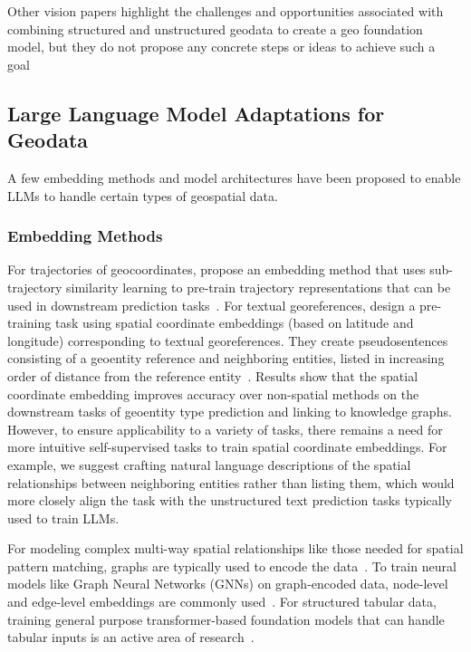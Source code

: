 Other vision papers highlight the challenges and opportunities associated with combining structured and unstructured geodata to create a geo foundation model, but they do not propose any concrete steps or ideas to achieve such a goal~\cite{Xie2023, Tan2023}



\subsection{Large Language Model Adaptations for Geodata}
A few embedding methods and model architectures have been proposed to enable LLMs to handle certain types of geospatial data.

\subsubsection{Embedding Methods}
For trajectories of geocoordinates, \citeauthor{Hu2023} propose an embedding method that uses sub-trajectory similarity learning to pre-train trajectory representations that can be used in downstream prediction tasks~\cite{Hu2023}.
%
For textual georeferences, \citeauthor{Li2021} design a pre-training task using spatial coordinate embeddings (based on latitude and longitude) corresponding to textual georeferences.
They create pseudosentences consisting of a geoentity reference and neighboring entities, listed in increasing order of distance from the reference entity~\cite{Li2021}.
Results show that the spatial coordinate embedding improves accuracy over non-spatial methods on the downstream tasks of geoentity type prediction and linking to knowledge graphs.
However, to ensure applicability to a variety of tasks, there remains a need for more intuitive self-supervised tasks to train spatial coordinate embeddings.
For example, we suggest crafting natural language descriptions of the spatial relationships between neighboring entities rather than listing them, which would more closely align the task with the unstructured text prediction tasks typically used to train LLMs.

For modeling complex multi-way spatial relationships like those needed for spatial pattern matching, graphs are typically used to encode the data~\cite{Folkers2000, Chen2019, Fang2019, Osul2023b}.
To train neural models like Graph Neural Networks (GNNs) on graph-encoded data, node-level and edge-level embeddings are commonly used~\cite{Bai2019,Krlevza2016,Liu2020Neural}.
For structured tabular data, training general purpose transformer-based foundation models that can handle tabular inputs is an active area of research~\cite{Cong2023, Badaro2023,    Iida2021, Somepalli2022, Seng2022, Yin2020, Herzig2020}.

